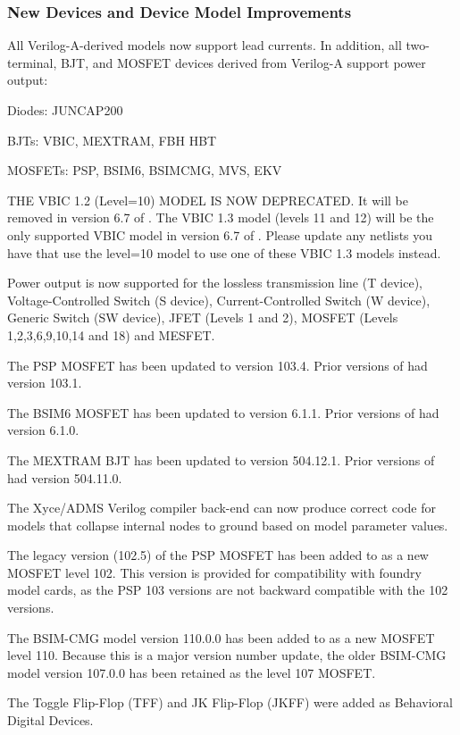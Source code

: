 \documentclass{article}
\begin{document}
\subsubsection*{New Devices and Device Model Improvements}
\begin{XyceItemize}
\item All Verilog-A-derived models now support lead currents.  In addition, all two-terminal, BJT, and MOSFET devices derived from Verilog-A support power output:
  \begin{XyceItemize}
  \item Diodes: JUNCAP200
  \item BJTs: VBIC, MEXTRAM, FBH HBT
  \item MOSFETs: PSP, BSIM6, BSIMCMG, MVS, EKV
  \end{XyceItemize}
  \item THE VBIC 1.2 (Level=10) MODEL IS NOW DEPRECATED.  It will be removed in version 6.7 of \Xyce{}.  The VBIC 1.3 model (levels 11 and 12) will be the only supported VBIC model in version 6.7 of \Xyce{}.  Please update any netlists you have that use the level=10 model to use one of these VBIC 1.3 models instead.
  \item Power output is now supported for the lossless transmission line (T device), Voltage-Controlled 
  Switch (S device), Current-Controlled Switch (W device), Generic Switch (SW device), JFET (Levels 1 and 2),
  MOSFET (Levels 1,2,3,6,9,10,14 and 18) and MESFET.
  \item The PSP MOSFET has been updated to version 103.4.  Prior versions of \Xyce{} had version 103.1.
  \item The BSIM6 MOSFET has been updated to version 6.1.1.  Prior versions of \Xyce{} had version 6.1.0.
  \item The MEXTRAM BJT has been updated to version 504.12.1.  Prior versions of \Xyce{} had version 504.11.0.
  \item The Xyce/ADMS Verilog compiler back-end can now produce correct code for models that collapse internal nodes to ground based on model parameter values.
  \item The legacy version (102.5) of the PSP MOSFET has been added to \Xyce{} as a new MOSFET level 102.  This version is provided for compatibility with foundry model cards, as the PSP 103 versions are not backward compatible with the 102 versions.
  \item The BSIM-CMG model version 110.0.0 has been added to \Xyce{} as a new MOSFET level 110.  Because this is a major version number update, the older BSIM-CMG model version 107.0.0 has been retained as the level 107 MOSFET.
  \item The Toggle Flip-Flop (TFF) and JK Flip-Flop (JKFF) were added as Behavioral Digital Devices.
\end{XyceItemize}
\end{document}
